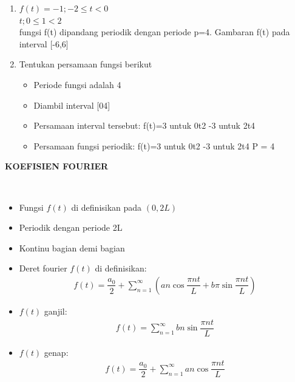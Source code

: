 \documentclass{article}
\begin{document}
\begin{enumerate}
    \item $f(t)= -1;-2 \le t < 0$\\
          $ t ; 0 \le 1 < 2$\\
          fungsi f(t) dipandang periodik dengan periode p=4. Gambaran f(t) pada interval [-6,6]
    \item Tentukan persamaan fungsi berikut
          \begin{itemize}
              \item Periode fungsi adalah 4
              \item Diambil interval [04]
              \item Persamaan interval tersebut:
                    f(t)=3 untuk 0t2
                    -3 untuk 2t4
              \item  Persamaan fungsi periodik:
                    f(t)=3 untuk 0t2
                    -3 untuk 2t4
                    P = 4
          \end{itemize}
\end{enumerate}



\newpage
\begin{center}
    \textbf{KOEFISIEN FOURIER}
\end{center}
\leavevmode\\
\begin{itemize}
    \item Fungsi $f(t)$ di definisikan pada $(0, 2L)$
    \item Periodik dengan periode 2L
    \item Kontinu bagian demi bagian
    \item Deret fourier $f(t)$ di definisikan:
          \begin{align}
              f(t) = \dfrac{a_0}{2} + \sum_{n = 1}^{\infty} (an \cos \dfrac{\pi nt}{L} + b\pi \sin \dfrac{\pi nt}{L})
              \nonumber
          \end{align}
    \item $f(t)$ ganjil:
          \begin{align}
              f(t) = \sum_{n = 1}^{\infty} bn \sin \dfrac{\pi nt}{L}
              \nonumber
          \end{align}
    \item $f(t)$ genap:
          \begin{align}
              f(t) = \dfrac{a_0}{2} + \sum_{n = 1}^{\infty} an \cos \dfrac{\pi nt}{L}
              \nonumber
          \end{align}
\end{itemize}
\end{document}

